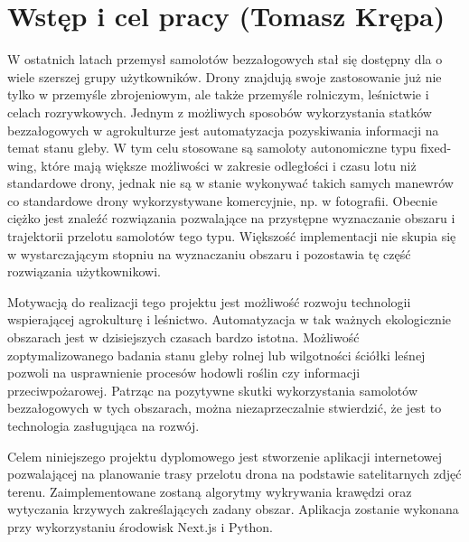 \chapter{Wstęp i cel pracy (Tomasz Krępa)}
\label{chap:introduction}
W ostatnich latach przemysł samolotów bezzałogowych stał się dostępny dla o wiele szerszej grupy użytkowników. Drony znajdują swoje zastosowanie już nie tylko w przemyśle zbrojeniowym, ale także przemyśle rolniczym, leśnictwie i celach rozrywkowych. Jednym z możliwych sposobów wykorzystania statków bezzałogowych w agrokulturze jest automatyzacja pozyskiwania informacji na temat stanu gleby. W tym celu stosowane są samoloty autonomiczne typu fixed-wing, które mają większe możliwości w zakresie odległości i czasu lotu niż standardowe drony, jednak nie są w stanie wykonywać takich samych manewrów co standardowe drony wykorzystywane komercyjnie, np. w fotografii. Obecnie ciężko jest znaleźć rozwiązania pozwalające na przystępne wyznaczanie obszaru i trajektorii przelotu samolotów tego typu. Większość implementacji nie skupia się w wystarczającym stopniu na wyznaczaniu obszaru i pozostawia tę część rozwiązania użytkownikowi. 

Motywacją do realizacji tego projektu jest możliwość rozwoju technologii wspierającej agrokulturę i leśnictwo. Automatyzacja w tak ważnych ekologicznie obszarach jest w dzisiejszych czasach bardzo istotna. Możliwość zoptymalizowanego badania stanu gleby rolnej lub wilgotności ściółki leśnej pozwoli na usprawnienie procesów hodowli roślin czy informacji przeciwpożarowej. Patrząc na pozytywne skutki wykorzystania samolotów bezzałogowych w tych obszarach, można niezaprzeczalnie stwierdzić, że jest to technologia zasługująca na rozwój.

Celem niniejszego projektu dyplomowego jest stworzenie aplikacji internetowej pozwalającej na planowanie trasy przelotu drona na podstawie satelitarnych zdjęć terenu. Zaimplementowane zostaną algorytmy wykrywania krawędzi oraz wytyczania krzywych zakreślających zadany obszar. Aplikacja zostanie wykonana przy wykorzystaniu środowisk Next.js i Python.

